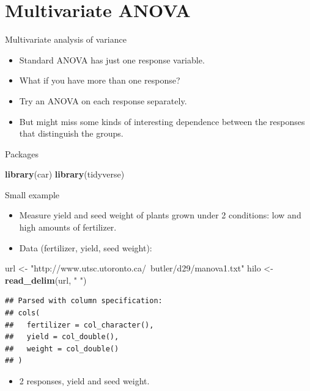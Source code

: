 \documentclass[ignorenonframetext,]{beamer}
\newenvironment{Shaded}{\begin{snugshade}}{\end{snugshade}}
\newcommand{\KeywordTok}[1]{\textcolor[rgb]{0.13,0.29,0.53}{\textbf{#1}}}
\newcommand{\NormalTok}[1]{#1}
\newcommand{\StringTok}[1]{\textcolor[rgb]{0.31,0.60,0.02}{#1}}
\providecommand{\tightlist}{%
  \setlength{\itemsep}{0pt}\setlength{\parskip}{0pt}}
\begin{document}
\hypertarget{multivariate-anova}{%
\section{Multivariate ANOVA}\label{multivariate-anova}}

\begin{frame}{Multivariate analysis of variance}
\protect\hypertarget{multivariate-analysis-of-variance}{}

\begin{itemize}
\item
  Standard ANOVA has just one response variable.
\item
  What if you have more than one response?
\item
  Try an ANOVA on each response separately.
\item
  But might miss some kinds of interesting dependence between the
  responses that distinguish the groups.
\end{itemize}

\end{frame}

\begin{frame}[fragile]{Packages}
\protect\hypertarget{packages-4}{}

\begin{Shaded}
\begin{Highlighting}[]
\KeywordTok{library}\NormalTok{(car)}
\KeywordTok{library}\NormalTok{(tidyverse)}
\end{Highlighting}
\end{Shaded}

\end{frame}

\begin{frame}[fragile]{Small example}
\protect\hypertarget{small-example}{}

\begin{itemize}
\item
  Measure yield and seed weight of plants grown under 2 conditions: low
  and high amounts of fertilizer.
\item
  Data (fertilizer, yield, seed weight):
\end{itemize}

\begin{Shaded}
\begin{Highlighting}[]
\NormalTok{url <-}\StringTok{ "http://www.utsc.utoronto.ca/~butler/d29/manova1.txt"}
\NormalTok{hilo <-}\StringTok{ }\KeywordTok{read_delim}\NormalTok{(url, }\StringTok{" "}\NormalTok{)}
\end{Highlighting}
\end{Shaded}

\begin{verbatim}
## Parsed with column specification:
## cols(
##   fertilizer = col_character(),
##   yield = col_double(),
##   weight = col_double()
## )
\end{verbatim}

\begin{itemize}
\tightlist
\item
  2 responses, yield and seed weight.
\end{itemize}

\end{frame}
\end{document}
